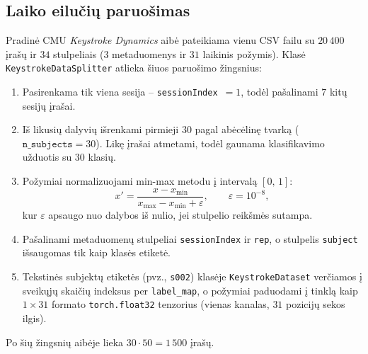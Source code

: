 \subsection{Laiko eilučių paruošimas}
\label{subsec:laiko_eiluciu_paruosimas}

Pradinė CMU \textit{Keystroke Dynamics} aibė pateikiama vienu CSV failu su $20\,400$ įrašų ir $34$ stulpeliais ($3$ metaduomenys ir $31$ laikinis požymis). Klasė \texttt{KeystrokeDataSplitter} atlieka šiuos paruošimo žingsnius:
\begin{enumerate}
    \item Pasirenkama tik viena sesija – \texttt{sessionIndex}~$=1$, todėl pašalinami $7$ kitų sesijų įrašai.
    \item Iš likusių dalyvių išrenkami pirmieji $30$ pagal abėcėlinę tvarką ($\texttt{n\_subjects}=30$). Likę įrašai atmetami, todėl gaunama klasifikavimo užduotis su $30$ klasių.
    \item Požymiai normalizuojami min-max metodu į intervalą $[0,\,1]$:
    \[
        x' = \frac{x - x_{\min}}{x_{\max} - x_{\min} + \varepsilon},\qquad \varepsilon = 10^{-8},
    \]
    kur $\varepsilon$ apsaugo nuo dalybos iš nulio, jei stulpelio reikšmės sutampa.
    \item Pašalinami metaduomenų stulpeliai \texttt{sessionIndex} ir \texttt{rep}, o stulpelis \texttt{subject} išsaugomas tik kaip klasės etiketė.
    \item Tekstinės subjektų etiketės (pvz., \texttt{s002}) klasėje \texttt{KeystrokeDataset} verčiamos į sveikųjų skaičių indeksus per \texttt{label\_map}, o požymiai paduodami į tinklą kaip $1 \times 31$ formato \texttt{torch.float32} tenzorius (vienas kanalas, $31$ pozicijų sekos ilgis).
\end{enumerate}

Po šių žingsnių aibėje lieka $30 \cdot 50 = 1\,500$ įrašų.
